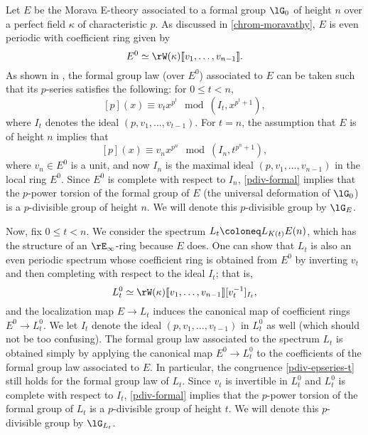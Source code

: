\begin{nothing}
  \label{pdiv-ethy}
  Let $E$ be the Morava E-theory associated to a formal group $\lG_0$
  of height $n$ over a perfect field $\kappa$ of characteristic
  $p$. As discussed in \cref{chrom-moravathy}, $E$ is even periodic
  with coefficient ring given by
  \[
  E^0 \iso \rW(\kappa) \ldb v_1, \ldots, v_{n-1} \rdb.
  \]
  As shown in \cite{rezk-hopkinsmiller}, the formal group law (over
  $E^0$) associated to $E$ can be taken such that its $p$-series
  satisfies the following: for $0 \le t < n$,
  \begin{equation}
    \label{pdiv-epseries-t}
    [p](x) \equiv v_tx^{p^t} \mod (I_t, x^{p^t+1}),
  \end{equation}
  where $I_t$ denotes the ideal $(p,v_1,\ldots,v_{t-1})$. For $t =
  n$, the assumption that $E$ is of height $n$ implies that
  \begin{equation}
    \label{pdiv-epseries-n}
    [p](x) \equiv v_nx^{p^n} \mod (I_n, t^{p^n+1}),
  \end{equation}
  where $v_n \in E^0$ is a unit, and now $I_n$ is the maximal ideal
  $(p,v_1,\ldots,v_{n-1})$ in the local ring $E^0$. Since $E^0$ is
  complete with respect to $I_n$, \cref{pdiv-formal} implies that the
  $p$-power torsion of the formal group of $E$ (the universal
  deformation of $\lG_0$) is a $p$-divisible group of height $n$. We
  will denote this $p$-divisible group by $\lG_E$.
\end{nothing}

\begin{nothing}
  \label{pdiv-ktlocal}
  Now, fix $0 \le t < n$. We consider the spectrum
  $L_t \ce L_{K(t)}E(n)$, which has the structure of an
  $\rE_\infty$-ring because $E$ does. One can show that $L_t$ is also
  an even periodic spectrum whose coefficient ring is obtained from
  $E^0$ by inverting $v_t$ and then completing with respect to the
  ideal $I_t$; that is,
  \[
  L_t^0 \iso \rW(\kappa) \ldb v_1, \ldots, v_{n-1} \rdb
  [v_t^{-1}]_{I_t},
  \]
  and the localization map $E \to L_t$ induces the canonical map of
  coefficient rings $E^0 \to L_t^0$. We let $I_t$ denote the ideal
  $(p,v_1,\ldots,v_{t-1})$ in $L_t^0$ as well (which should not be too
  confusing). The formal group law associated to the spectrum $L_t$ is
  obtained simply by applying the canonical map $E^0 \to L_t^0$ to the
  coefficients of the formal group law associated to $E$. In
  particular, the congruence \cref{pdiv-epseries-t} still holds for
  the formal group law of $L_t$. Since $v_t$ is invertible in $L_t^0$
  and $L_t^0$ is complete with respect to $I_t$, \cref{pdiv-formal}
  implies that the $p$-power torsion of the formal group of $L_t$ is a
  $p$-divisible group of height $t$. We will denote this $p$-divisible
  group by $\lG_{L_t}$.
\end{nothing}

